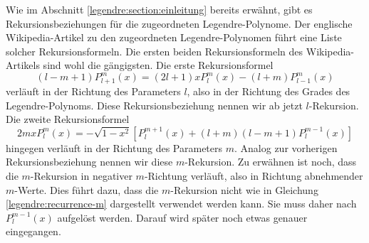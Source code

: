 Wie im Abschnitt \ref{legendre:section:einleitung} bereits erwähnt, gibt es Rekursionsbeziehungen für die zugeordneten Legendre-Polynome.
%
Der englische Wikipedia-Artikel \cite{legendre:wikipedia} zu den zugeordneten Legendre-Polynomen führt eine Liste solcher Rekursionsformeln.
Die ersten beiden Rekursionsformeln des Wikipedia-Artikels sind wohl die gängigsten.
Die erste Rekursionsformel
\begin{equation}
(l-m+1)P^{m}_{l+1}(x)
=(2l+1)xP^{m}_{l}(x)
-(l+m)P^{m}_{l-1}(x)
\label{legendre:recurrence-l}
\end{equation}
verläuft in der Richtung des Parameters $l$, also in der Richtung des Grades des Legendre-Polynoms.
Diese Rekursionsbeziehung nennen wir ab jetzt $l$-Rekursion.
%
Die zweite Rekursionsformel
\begin{equation}
2mxP^{m}_{l}(x)
=-\sqrt{1-x^2}
\left[ P^{m+1}_{l}(x) + (l+m)(l-m+1)P^{m-1}_{l}(x) \right]
\label{legendre:recurrence-m}
\end{equation}
hingegen verläuft in der Richtung des Parameters $m$.
Analog zur vorherigen Rekursionsbeziehung nennen wir diese $m$-Rekursion.
%
Zu erwähnen ist noch, dass die $m$-Rekursion in negativer $m$-Richtung verläuft, also in Richtung abnehmender $m$-Werte.
Dies führt dazu, dass die $m$-Rekursion nicht wie in Gleichung \eqref{legendre:recurrence-m} dargestellt verwendet werden kann.
Sie muss daher nach $P^{m-1}_{l}(x)$ aufgelöst werden.
Darauf wird später noch etwas genauer eingegangen.

